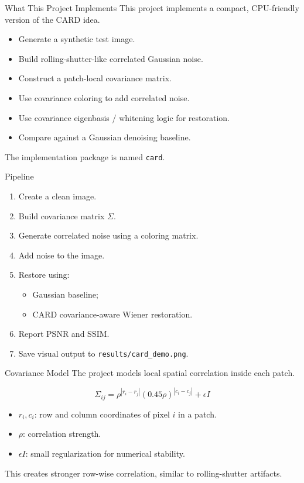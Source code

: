 \documentclass[aspectratio=169]{beamer}
\begin{document}
\begin{frame}{What This Project Implements}
  This project implements a compact, CPU-friendly version of the CARD idea.

  \begin{itemize}
    \item Generate a synthetic test image.
    \item Build rolling-shutter-like correlated Gaussian noise.
    \item Construct a patch-local covariance matrix.
    \item Use covariance coloring to add correlated noise.
    \item Use covariance eigenbasis / whitening logic for restoration.
    \item Compare against a Gaussian denoising baseline.
  \end{itemize}

  \vspace{0.3cm}
  The implementation package is named \texttt{card}.
\end{frame}

\begin{frame}{Pipeline}
  \begin{enumerate}
    \item Create a clean image.
    \item Build covariance matrix \(\Sigma\).
    \item Generate correlated noise using a coloring matrix.
    \item Add noise to the image.
    \item Restore using:
      \begin{itemize}
        \item Gaussian baseline;
        \item CARD covariance-aware Wiener restoration.
      \end{itemize}
    \item Report PSNR and SSIM.
    \item Save visual output to \texttt{results/card\_demo.png}.
  \end{enumerate}
\end{frame}

\begin{frame}{Covariance Model}
  The project models local spatial correlation inside each patch.

  \[
    \Sigma_{ij}
    =
    \rho^{|r_i-r_j|}
    (0.45\rho)^{|c_i-c_j|}
    +
    \epsilon I
  \]

  \begin{itemize}
    \item \(r_i, c_i\): row and column coordinates of pixel \(i\) in a patch.
    \item \(\rho\): correlation strength.
    \item \(\epsilon I\): small regularization for numerical stability.
  \end{itemize}

  This creates stronger row-wise correlation, similar to rolling-shutter artifacts.
\end{frame}
\end{document}
